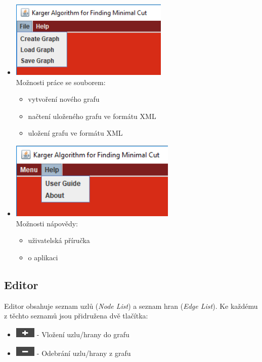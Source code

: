\documentclass[../projekt.tex]{subfiles}
\begin{document}
\begin{itemize}
    \item[] \includegraphics[height=10em]{obrazky-figures/file.png} \\Možnosti práce se souborem:
    \begin{itemize} \item vytvoření nového grafu
                    \item načtení uloženého grafu ve formátu XML
                    \item uložení grafu ve formátu XML
   \end{itemize}
    \item[] \includegraphics[height=10em]{obrazky-figures/help.png} \\Možnosti nápovědy:
    \begin{itemize} \item uživatelská příručka
                    \item o aplikaci
    \end{itemize}
\end{itemize}



\subsection{Editor}

Editor obsahuje seznam uzlů (\textit{Node List}) a seznam hran (\textit{Edge List}).
Ke každému z těchto seznamů jsou přidružena dvě tlačítka: 

\begin{itemize}
    \item[] \includegraphics[height=1.3em]{obrazky-figures/addButton.png} - Vložení uzlu/hrany do grafu
    \item[] \includegraphics[height=1.3em]{obrazky-figures/removeButton.png} - Odebrání uzlu/hrany z grafu \\
\end{itemize} 
\end{document}
